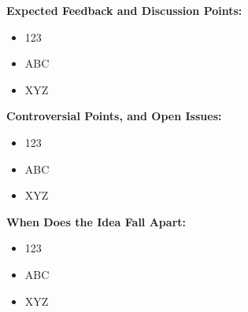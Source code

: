 \noindent
\textbf{Expected Feedback and Discussion Points:}
\begin{itemize}
    \item 123
    \item ABC
    \item XYZ 
\end{itemize}

\noindent
\textbf{Controversial Points, and Open Issues:}
\begin{itemize}
    \item 123
    \item ABC
    \item XYZ 
\end{itemize}

\noindent
\textbf{When Does the Idea Fall Apart:}
\begin{itemize}
    \item 123
    \item ABC
    \item XYZ 
\end{itemize}